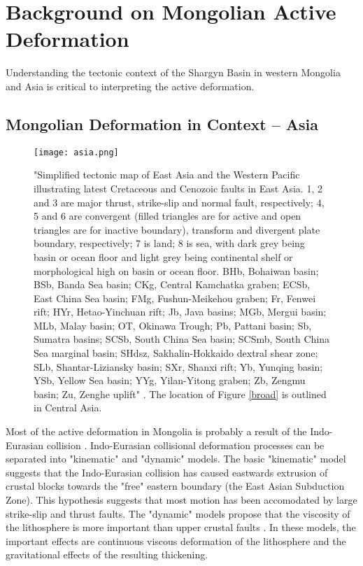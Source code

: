 \section{Background on Mongolian Active Deformation}
	Understanding the tectonic context of the Shargyn Basin in western Mongolia and Asia is critical to interpreting the active deformation. 

\subsection{Mongolian Deformation in Context -- Asia}

\begin{figure}[h!]
	\centering
	\texttt{[image: asia.png]}
	\caption{"Simplified tectonic map of East Asia and the Western Pacific illustrating latest Cretaceous and Cenozoic faults in East Asia. 1, 2 and 3 are major thrust, strike-slip and normal fault, respectively; 4, 5 and 6 are convergent (filled triangles are for active and open triangles are for inactive boundary), transform and divergent plate boundary, respectively; 7 is land; 8 is sea, with dark grey being basin or ocean floor and light grey being continental shelf or morphological high on basin or ocean floor. BHb, Bohaiwan basin; BSb, Banda Sea basin; CKg, Central Kamchatka graben; ECSb, East China Sea basin; FMg, Fushun-Meikehou graben; Fr, Fenwei rift; HYr, Hetao-Yinchuan rift; Jb, Java basins; MGb, Mergui basin; MLb, Malay basin; OT, Okinawa Trough; Pb, Pattani basin; Sb, Sumatra basins; SCSb, South China Sea basin; SCSmb, South China Sea marginal basin; SHdsz, Sakhalin-Hokkaido dextral shear zone; SLb, Shantar-Liziansky basin; SXr, Shanxi rift; Yb, Yunqing basin; YSb, Yellow Sea basin; YYg, Yilan-Yitong graben; Zb, Zengmu basin; Zu, Zenghe uplift" \citep{Schellart2005}. The location of Figure \ref{broad} is outlined in Central Asia. }
	\label{asia}
\end{figure}	

	Most of the active deformation in Mongolia is probably a result of the Indo-Eurasian collision \citep{Yin2010}\citep{Walker2007}\citep{Cunningham2005a}\citep{England1997}. Indo-Eurasian collisional deformation processes can be separated into "kinematic" and "dynamic" models. The basic "kinematic" model suggests that the Indo-Eurasian collision has caused eastwards extrusion of crustal blocks towards the "free" eastern boundary (the East Asian Subduction Zone)\citep{Tapponnier1982}\citep{Peltzer1996}. This hypothesis suggests that most motion has been accomodated by large strike-slip and thrust faults. The "dynamic" models propose that the viscosity of the lithosphere is more important than upper crustal faults \citep{Houseman1993}\citep{England1997}. In these models, the important effects are continuous viscous deformation of the lithosphere and the gravitational effects of the resulting thickening. 

